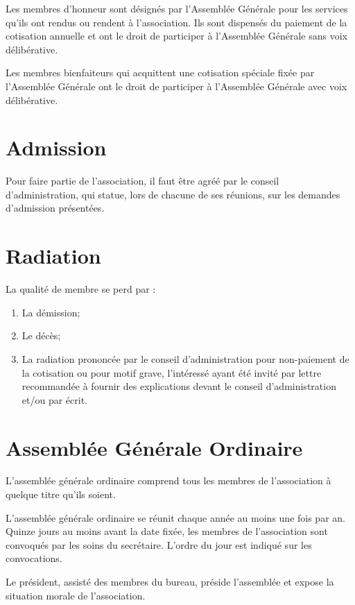 \documentclass[12pt]{constitution}
\begin{document}
\medskip
Les membres d'honneur sont désignés par l'Assemblée Générale pour les services qu'ils ont rendus ou rendent à l'association. Ils sont dispensés du paiement de la cotisation annuelle et ont le droit de participer à l'Assemblée Générale sans voix délibérative.

\medskip
Les membres bienfaiteurs qui acquittent une cotisation spéciale fixée par l'Assemblée Générale ont le droit de participer à l'Assemblée Générale avec voix délibérative.

\section{Admission}
Pour faire partie de l'association, il faut être agréé par le conseil d’administration, qui statue, lors de chacune de ses réunions, sur les demandes d'admission présentées.

\section{Radiation}
La qualité de membre se perd par :
\begin{enumerate}
	\item La démission;
	\item Le décès;
	\item La radiation prononcée par le conseil d'administration pour non-paiement de la cotisation ou pour motif grave, l'intéressé ayant été invité par lettre recommandée à fournir des explications devant le conseil d'administration et/ou par écrit. 
\end{enumerate}


\section{Assemblée Générale Ordinaire}
\label{AGO}
L'assemblée générale ordinaire comprend tous les membres de l'association à quelque titre qu'ils soient.

\medskip
L’assemblée générale ordinaire se réunit chaque année au moins une fois par an. Quinze jours au moins avant la date fixée, les membres de l’association sont convoqués par les soins du secrétaire. L’ordre du jour est indiqué sur les convocations.

\medskip
Le président, assisté des membres du bureau, préside l'assemblée et expose la situation morale de l’association.
\end{document}
